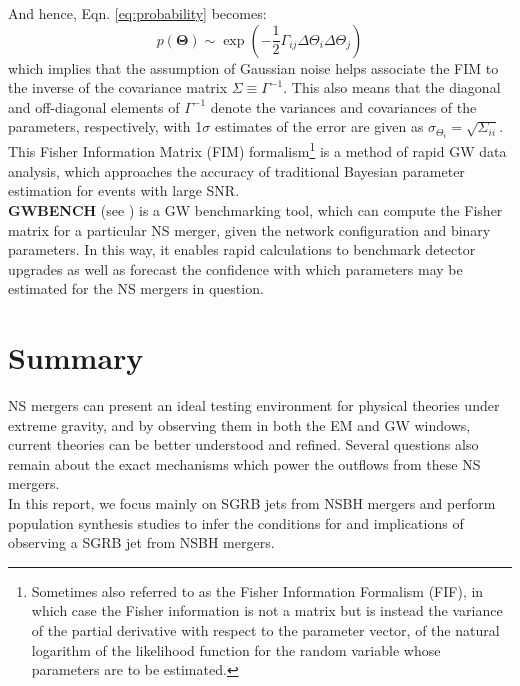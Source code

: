    And hence, Eqn. \ref{eq:probability} becomes:
    \begin{equation}
        p(\mathbf{\Theta}) \sim
            \exp\left(
                         -\dfrac{1}{2}
                          \Gamma_{ij}
                          \Delta\Theta_i
                          \Delta\Theta_j
                \right)
    \end{equation}
    which implies that the assumption of Gaussian noise helps associate the FIM to the
    inverse of the covariance matrix $\Sigma \equiv \Gamma^{-1}$. This also means that
    the diagonal and off-diagonal elements of $\Gamma^{-1}$ denote the variances and
    covariances of the parameters, respectively, with 1$\sigma$ estimates of the error
    are given as $\sigma_{\Theta_i} = \sqrt{\Sigma_{ii}}$.\\
    This Fisher Information Matrix (FIM) formalism\footnote{
        Sometimes also referred to as the Fisher Information Formalism (FIF), in which
        case the Fisher information is not a matrix but is instead the variance of the
        partial derivative with respect to the parameter vector, of the natural
        logarithm of the likelihood function for the random variable whose parameters
        are to be estimated.
    } is a method of rapid GW data analysis, which approaches the accuracy of
    traditional Bayesian parameter estimation for events with large SNR.\\
    \textbf{GWBENCH} (see \cite{borhanian_2020}) is a GW benchmarking tool, which can
    compute the Fisher matrix for a particular NS merger, given the network
    configuration and binary parameters. In this way, it enables rapid calculations to
    benchmark detector upgrades as well as forecast the confidence with which parameters
    may be estimated for the NS mergers in question.\\

\section{Summary}

    NS mergers can present an ideal testing environment for physical theories under
    extreme gravity, and by observing them in both the EM and GW windows, current
    theories can be better understood and refined. Several questions also remain about
    the exact mechanisms which power the outflows from these NS mergers.\\
    In this report, we focus mainly on SGRB jets from NSBH mergers and perform
    population synthesis studies to infer the conditions for and implications of
    observing a SGRB jet from NSBH mergers.
